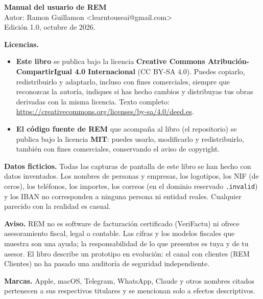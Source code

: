 \thispagestyle{empty}
\vspace*{\fill}
\begin{small}\sffamily
\textbf{Manual del usuario de REM}\\
Autor: Ramon Guillamon \textless learntouseai@gmail.com\textgreater\\
Edición 1.0, octubre de 2026.

\medskip\textbf{Licencias.}
\begin{itemize}
\item \textbf{Este libro} se publica bajo la licencia \textbf{Creative Commons Atribución-CompartirIgual 4.0 Internacional} (CC BY-SA 4.0). Puedes copiarlo, redistribuirlo y adaptarlo, incluso con fines comerciales, siempre que reconozcas la autoría, indiques si has hecho cambios y distribuyas tus obras derivadas con la misma licencia. Texto completo: \url{https://creativecommons.org/licenses/by-sa/4.0/deed.es}.
\item \textbf{El código fuente de REM} que acompaña al libro (el repositorio) se publica bajo la licencia \textbf{MIT}: puedes usarlo, modificarlo y redistribuirlo, también con fines comerciales, conservando el aviso de copyright.
\end{itemize}

\medskip\textbf{Datos ficticios.} Todas las capturas de pantalla de este libro se han hecho con datos inventados. Los nombres de personas y empresas, los logotipos, los NIF (de ceros), los teléfonos, los importes, los correos (en el dominio reservado \texttt{.invalid}) y los IBAN no corresponden a ninguna persona ni entidad reales. Cualquier parecido con la realidad es casual.

\medskip\textbf{Aviso.} REM no es software de facturación certificado (VeriFactu) ni ofrece asesoramiento fiscal, legal o contable. Las cifras y los modelos fiscales que muestra son una ayuda; la responsabilidad de lo que presentes es tuya y de tu asesor. El libro describe un prototipo en evolución: el canal con clientes (REM Clientes) no ha pasado una auditoría de seguridad independiente.

\medskip\textbf{Marcas.} Apple, macOS, Telegram, WhatsApp, Claude y otros nombres citados pertenecen a sus respectivos titulares y se mencionan solo a efectos descriptivos.
\end{small}
\vspace*{\fill}
\cleardoublepage
